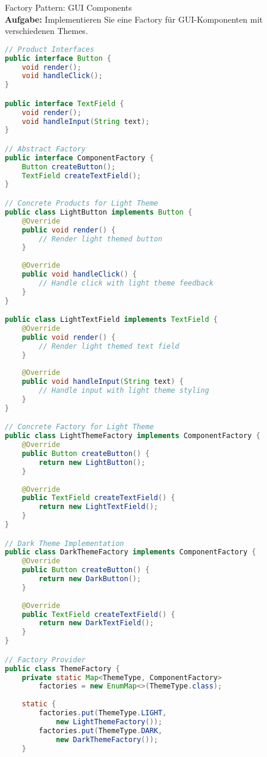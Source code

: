 \begin{example2}{Factory Pattern: GUI Components}\\
\textbf{Aufgabe:} Implementieren Sie eine Factory für GUI-Komponenten mit verschiedenen Themes.

\begin{lstlisting}[language=Java, style=basesmol]
// Product Interfaces
public interface Button {
    void render();
    void handleClick();
}

public interface TextField {
    void render();
    void handleInput(String text);
}

// Abstract Factory
public interface ComponentFactory {
    Button createButton();
    TextField createTextField();
}

// Concrete Products for Light Theme
public class LightButton implements Button {
    @Override
    public void render() {
        // Render light themed button
    }
    
    @Override
    public void handleClick() {
        // Handle click with light theme feedback
    }
}

public class LightTextField implements TextField {
    @Override
    public void render() {
        // Render light themed text field
    }
    
    @Override
    public void handleInput(String text) {
        // Handle input with light theme styling
    }
}

// Concrete Factory for Light Theme
public class LightThemeFactory implements ComponentFactory {
    @Override
    public Button createButton() {
        return new LightButton();
    }
    
    @Override
    public TextField createTextField() {
        return new LightTextField();
    }
}

// Dark Theme Implementation
public class DarkThemeFactory implements ComponentFactory {
    @Override
    public Button createButton() {
        return new DarkButton();
    }
    
    @Override
    public TextField createTextField() {
        return new DarkTextField();
    }
}

// Factory Provider
public class ThemeFactory {
    private static Map<ThemeType, ComponentFactory> 
        factories = new EnumMap<>(ThemeType.class);
        
    static {
        factories.put(ThemeType.LIGHT, 
            new LightThemeFactory());
        factories.put(ThemeType.DARK, 
            new DarkThemeFactory());
    }
    

\end{lstlisting}
\end{example2}
